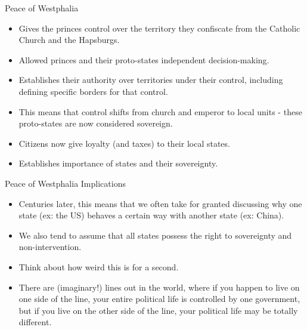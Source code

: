 \documentclass[handout]{beamer}
\begin{document}
\begin{frame}{\LARGE Peace of Westphalia}
\begin{itemize}
    \item Gives the princes control over the territory they confiscate from the Catholic Church and the Hapsburgs. \pause
    \item Allowed princes and their proto-states independent decision-making. \pause
    \item Establishes their authority over territories under their control, including defining specific borders for that control. \pause
    \item This means that control shifts from church and emperor to local units - these proto-states are now considered sovereign. \pause
    \item Citizens now give loyalty (and taxes) to their local states.
    \item Establishes importance of states and their sovereignty.
\end{itemize}
\end{frame}

\begin{frame}{\LARGE Peace of Westphalia Implications}
	\begin{itemize}
		\item Centuries later, this means that we often take for granted discussing why one state (ex: the US) behaves a certain way with another state (ex: China).
		\item We also tend to assume that all states possess the right to sovereignty and non-intervention.
		\item Think about how weird this is for a second. \pause
		\item There are (imaginary!) lines out in the world, where if you happen to live on one side of the line, your entire political life is controlled by one government, but if you live on the other side of the line, your political life may be totally different.
	\end{itemize}
\end{frame}
\end{document}
